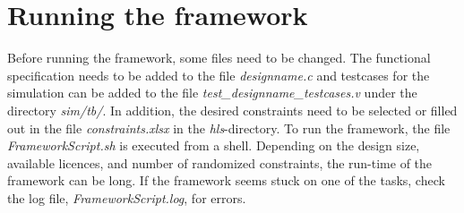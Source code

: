\section{\label{sec:runframework}Running the framework}
Before running the framework, some files need to be changed. The functional specification needs to be added to the file \textit{designname.c} and testcases for the simulation can be added to the file \textit{test\_designname\_testcases.v} under the directory \textit{sim/tb/}. In addition, the desired constraints need to be selected or filled out in the file \textit{constraints.xlsx} in the \textit{hls}-directory. To run the framework, the file \textit{FrameworkScript.sh} is executed from a shell. Depending on the design size, available licences, and number of randomized constraints, the run-time of the framework can be long. If the framework seems stuck on one of the tasks, check the log file, \textit{FrameworkScript.log}, for errors.

